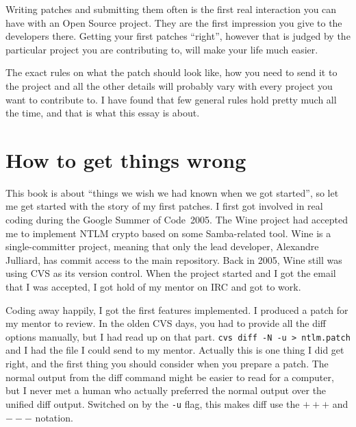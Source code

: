 

Writing patches and submitting them often is the first real interaction you can
have with an Open Source project. They are the first impression you give to the
developers there. Getting your first patches ``right'', however that is judged
by the particular project you are contributing to, will make your life much
easier.

The exact rules on what the patch should look like, how you need to send it to
the project and all the other details will probably vary with every project you
want to contribute to. I have found that few general rules hold pretty much all
the time, and that is what this essay is about.

\section*{How to get things wrong}

This book is about ``things we wish we had known when we got started'',
so let me get started with the story of my first patches. I first got involved
in real coding during the Google Summer of Code\texttrademark ~2005. The Wine
project had accepted me to implement NTLM crypto based on some Samba-related
tool. Wine is a single-committer project, meaning that only the lead developer,
Alexandre Julliard, has commit access to the main repository. Back in 2005, Wine
still was using CVS as its version control. When the project started and I got
the email that I was accepted, I got hold of my mentor on IRC and got to work.

Coding away happily, I got the first features implemented. I produced a patch
for my mentor to review. In the olden CVS days, you had to provide all the diff
options manually, but I had read up on that part.
\mbox{\texttt{cvs diff -N -u > ntlm.patch}} and I had the file I could send to
my mentor. Actually this is one thing I did get right, and the first thing you
should consider when you prepare a patch. The normal output from the diff
command might be easier to read for a computer, but I never met a human who
actually preferred the normal output over the unified diff output. Switched on
by the \texttt{-u} flag, this makes diff use the \texttt{$+++$} and
\texttt{$---$} notation.

